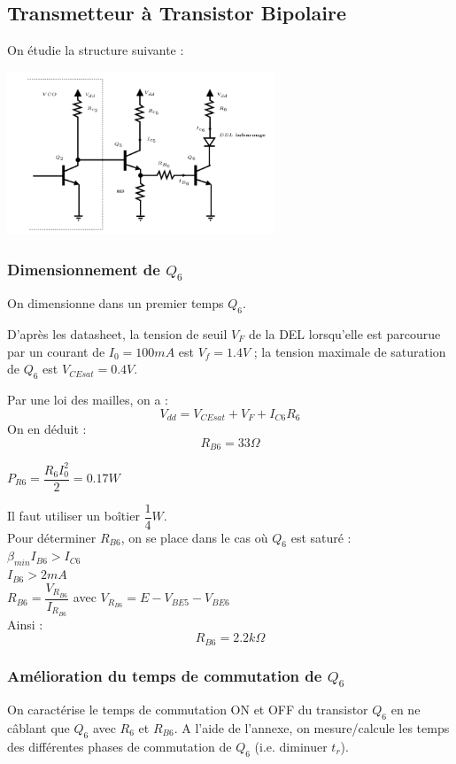 \documentclass[a4paper]{report}
\begin{document}
\subsection{Transmetteur à Transistor Bipolaire}
On étudie la structure suivante : 

\begin{center}
\includegraphics[width=0.6\textwidth]{montage_diode.PNG}
\end{center}

\subsubsection{Dimensionnement de $Q_6$}

On dimensionne dans un premier temps $Q_6$.

D'après les datasheet, la tension de seuil $V_F$ de la DEL lorsqu'elle est parcourue par un courant de $I_0 = 100mA$ est  $V_f = 1.4 V$ ; la tension maximale de saturation de $Q_6$ est $V_{CEsat} = 0.4 V$.

Par une loi des mailles, on a : 
$$ V_{dd} = V_{CEsat} + V_F + I_{C6}R_6$$
On en déduit : $$R_{B6} = 33\Omega$$

$P_{R6} = \dfrac{R_6 I_0^{2}}{2} = 0.17 W$

Il faut utiliser un boîtier $\dfrac{1}{4}W.$\\

Pour déterminer $R_{B6}$, on se place dans le cas où $Q_6$ est saturé :\\
$\beta_{min} I_{B6} > I_{C6}$\\
$I_{B6} > 2mA$\\
$R_{B6} = \dfrac{V_{R_{B6}}}{I_{R_{B6}}}$ avec $V_{R_{B6}} = E - V_{BE5} - V_{BE6}$\\
Ainsi : $$R_{B6} = 2.2k\Omega$$

\subsubsection{Amélioration du temps de commutation de $Q_6$}
On caractérise le temps de commutation ON et OFF du transistor $Q_6$ en ne câblant que $Q_6$ avec $R_6$ et $R_{B6}$. A l'aide de l'annexe, on mesure/calcule les temps des différentes phases de commutation de $Q_6$ (i.e. diminuer $t_r$).
\end{document}
